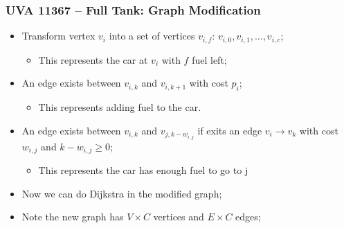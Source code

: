 \begin{frame}
  \frametitle{UVA 11367 -- Full Tank: Graph Modification}

    \begin{center}
    \end{center}

    \begin{itemize}
      \item Transform vertex $v_i$ into a set of vertices $v_{i,f}$: $v_{i,0}, v_{i,1}, \ldots, v_{i,c}$;
      \begin{itemize}
        \item This represents the car at $v_i$ with $f$ fuel left;
      \end{itemize}
      \item An edge exists between $v_{i,k}$ and $v_{i,k+1}$ with cost $p_i$;
      \begin{itemize}
        \item This represents adding fuel to the car.
      \end{itemize}
      \item An edge exists between $v_{i,k}$ and $v_{j,k-w_{i,j}}$ if exits an edge $v_i \to v_k$ with cost $w_{i,j}$ and $k-w_{i,j} \geq 0$;
      \begin{itemize}
        \item This represents the car has enough fuel to go to j
      \end{itemize}
      \item Now we can do Dijkstra in the modified graph;
      \item Note the new graph has $V\times C$ vertices and $E\times C$ edges;
    \end{itemize}
\end{frame}

